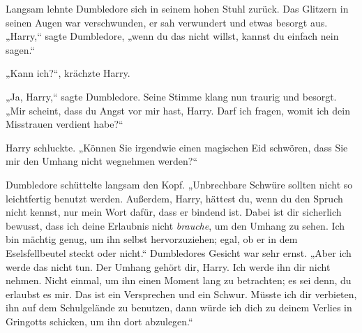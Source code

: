 Langsam lehnte Dumbledore sich in seinem hohen Stuhl zurück. Das Glitzern in seinen Augen war verschwunden, er sah verwundert und etwas besorgt aus. „Harry,“ sagte Dumbledore, „wenn du das nicht willst, kannst du einfach nein sagen.“

„Kann ich?“, krächzte Harry.

„Ja, Harry,“ sagte Dumbledore. Seine Stimme klang nun traurig und besorgt. „Mir scheint, dass du Angst vor mir hast, Harry. Darf ich fragen, womit ich dein Misstrauen verdient habe?“

Harry schluckte. „Können Sie irgendwie einen magischen Eid schwören, dass Sie mir den Umhang nicht wegnehmen werden?“

Dumbledore schüttelte langsam den Kopf. „Unbrechbare Schwüre sollten nicht so leichtfertig benutzt werden. Außerdem, Harry, hättest du, wenn du den Spruch nicht kennst, nur mein Wort dafür, dass er bindend ist. Dabei ist dir sicherlich bewusst, dass ich deine Erlaubnis nicht \emph{brauche}, um den Umhang zu sehen. Ich bin mächtig genug, um ihn selbst hervorzuziehen; egal, ob er in dem Eselsfellbeutel steckt oder nicht.“ Dumbledores Gesicht war sehr ernst. „Aber ich werde das nicht tun. Der Umhang gehört dir, Harry. Ich werde ihn dir nicht nehmen. Nicht einmal, um ihn einen Moment lang zu betrachten; es sei denn, du erlaubst es mir. Das ist ein Versprechen und ein Schwur. Müsste ich dir verbieten, ihn auf dem Schulgelände zu benutzen, dann würde ich dich zu deinem Verlies in Gringotts schicken, um ihn dort abzulegen.“

